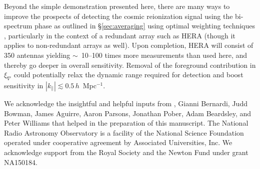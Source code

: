 \documentclass[
reprint,
superscriptaddress,
amsmath,
amssymb,
aps,
prd
]{revtex4-1}
\begin{document}
Beyond the simple demonstration presented here, there are many ways to improve the prospects of detecting the cosmic reionization signal using the bi-spectrum phase as outlined in \S\ref{sec:averaging} using optimal weighting techniques \cite{liu14a,liu14b,dil15}, particularly in the context of a redundant array such as HERA (though it applies to non-redundant arrays as well). Upon completion, HERA will consist of 350 antennas yielding $\sim$~10--100 times more measurements than used here, and thereby go deeper in overall sensitivity. Removal of the foreground contribution in $\xi_\nabla$ could potentially relax the dynamic range required for detection and boost sensitivity in $|k_\parallel| \lesssim 0.5\,h$~Mpc$^{-1}$. 

\begin{acknowledgments}
We acknowledge the insightful and helpful inputs from , Gianni Bernardi, Judd Bowman, James Aguirre, Aaron Parsons,  Jonathan Pober, Adam Beardsley, and Peter Williams that helped in the preparation of this manuscript. The National Radio Astronomy Observatory is a facility of the National Science Foundation operated under cooperative agreement by Associated Universities, Inc. We acknowledge support from the Royal Society and the Newton Fund under grant NA150184.
\end{acknowledgments}



\end{document}
